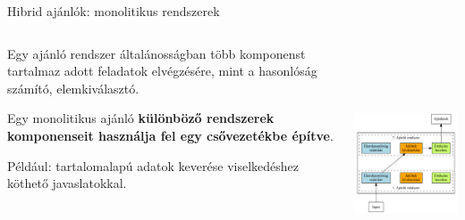 \documentclass[english, aspectratio=169]{beamer}
\begin{document}
\begin{frame}{Hibrid ajánlók: monolitikus rendszerek}
\begin{columns}
\begin{column}{.5\textwidth}
Egy ajánló rendszer általánosságban több komponenst tartalmaz adott feladatok elvégzésére, mint a hasonlóság számító, elemkiválasztó.\par\smallskip
Egy monolitikus ajánló \textbf{különböző rendszerek komponenseit használja fel egy csővezetékbe építve}.\par\smallskip
Például: tartalomalapú adatok keverése viselkedéshez köthető javaslatokkal.
\end{column}
\begin{column}{.5\textwidth}
\begin{center}
\includegraphics[width=7cm, height=7cm, keepaspectratio]{graphs/recommender_11.png}
\end{center}
\end{column}
\end{columns}
\end{frame}
\end{document}
